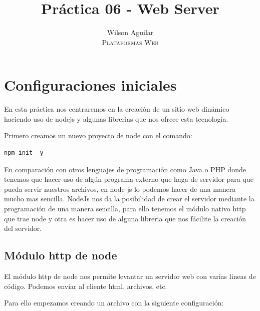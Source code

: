 \documentclass[12pt]{article}
\title{Práctica 06 - Web Server}
\author{
    Wilson Aguilar \\
    \textsc{Plataformas Web}
}
\begin{document}
\maketitle

\section{Configuraciones iniciales}

En esta práctica nos centraremos en la creación de un sitio web dinámico haciendo uso de nodejs y algunas librerias que nos ofrece esta tecnología.

Primero creamos un nuevo proyecto de node con el comando:

\begin{lstlisting}[numbers=none]
  npm init -y
\end{lstlisting}

En comparación con otros lenguajes de programación como Java o PHP donde tenemos que hacer uso de algún programa externo que haga de servidor para que pueda servir nuestros archivos, en node js lo podemos hacer de una manera mucho mas sencilla. NodeJs nos da la posibilidad de crear el servidor mediante la programación de una manera sencilla, para ello tenemos el módulo nativo http que trae node y otra es hacer uso de alguna libreria que nos fácilite la creación del servidor.

\subsection{Módulo http de node}

El módulo http de node nos permite levantar un servidor web con varias lineas de código. Podemos enviar al cliente html, archivos, etc.

Para ello empezamos creando un archivo con la siguiente configuración:
\end{document}
